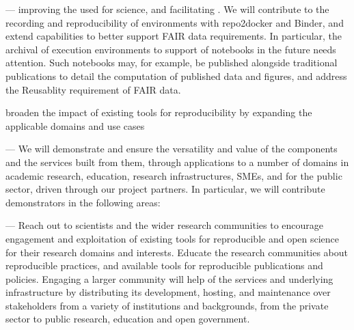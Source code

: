 \begin{compactenum}

\item \label{obj:reproducibility}  ---
  improving the 
  used for science, and facilitating .
  We will contribute to the recording and reproducibility
  of environments with repo2docker and Binder,
  and extend capabilities to better support FAIR
  data requirements. In particular, the archival of execution
  environments to support  of notebooks in the future
  needs attention. Such notebooks may, for example, be published alongside
  traditional publications to detail the computation of published data
  and figures, and address the Reusablity requirement of FAIR data.

\item \label{obj:broaden} broaden the impact of existing tools for reproducibility by expanding the applicable domains and use cases
\item \label{obj:demonstrators}
   ---
  We will demonstrate and ensure the versatility and value of the components and
  the services built from them,
  through applications to a number of
  domains in academic research, education, research infrastructures, SMEs, and for
  the public sector, driven through our project partners. In
  particular, we will contribute demonstrators in the following areas:

\item \label{obj:education}
   ---
  Reach out to scientists and the wider research
  communities to encourage engagement
  and exploitation of existing tools for reproducible and open science
  for their research domains and interests.
  Educate the research communities about reproducible practices,
  and available tools for reproducible publications and policies.
  Engaging a larger community will help  of
  the services and underlying infrastructure by distributing its
  development, hosting, and maintenance over stakeholders from a
  variety of institutions and backgrounds,
  from the private sector to public research, education
  and open government.



\end{compactenum}

